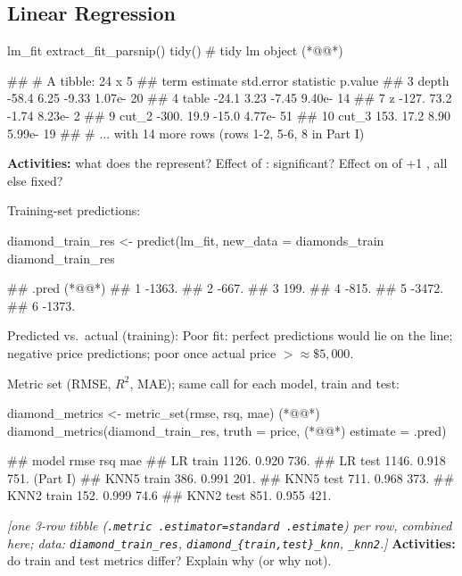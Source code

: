 \subsection{Linear Regression}
%
\begin{rcode}
lm_fit %
  extract_fit_parsnip() %
  tidy()                     # tidy lm object (*@@*)
\end{rcode}
\begin{routput}
## # A tibble: 24 x 5
##    term        estimate std.error statistic   p.value
##  3 depth         -58.4       6.25    -9.33  1.07e- 20
##  4 table         -24.1       3.23    -7.45  9.40e- 14
##  7 z            -127.       73.2     -1.74  8.23e-  2
##  9 cut_2        -300.       19.9    -15.0   4.77e- 51
## 10 cut_3         153.       17.2      8.90  5.99e- 19
## # ... with 14 more rows (rows 1-2, 5-6, 8 in Part I)
\end{routput}
%
\textbf{Activities:} what does the  represent? Effect of : significant? Effect on  of +1 , all else fixed?

Training-set predictions:
\begin{rcode}
diamond_train_res <- predict(lm_fit, new_data = diamonds_train %
diamond_train_res %
\end{rcode}
\begin{routput}
##    .pred                (*@@*)
## 1 -1363.
## 2  -667.
## 3   199.
## 4  -815.
## 5 -3472.
## 6 -1373.
\end{routput}
Predicted vs.\ actual (training):
Poor fit: perfect predictions would lie on the line; negative price predictions; poor once actual price $>\approx\$5{,}000$.

Metric set (RMSE, $R^2$, MAE); same call for each model, train and test:
\begin{rcode}
diamond_metrics <- metric_set(rmse, rsq, mae)    (*@@*)
diamond_metrics(diamond_train_res, truth = price,  (*@@*)
                estimate = .pred)
\end{rcode}
\begin{routput}
## model       rmse   rsq    mae
## LR train   1126.  0.920  736.
## LR test    1146.  0.918  751.  (Part I)
## KNN5 train  386.  0.991  201.
## KNN5 test   711.  0.968  373.
## KNN2 train  152.  0.999   74.6
## KNN2 test   851.  0.955  421.
\end{routput}
{\color{figgray}\itshape [one 3-row tibble (\texttt{.metric .estimator=standard .estimate}) per row, combined here; data: \texttt{diamond\_train\_res}, \texttt{diamond\_\{train,test\}\_knn}, \texttt{\_knn2}.]}
\textbf{Activities:} do train and test metrics differ? Explain why (or why not).

